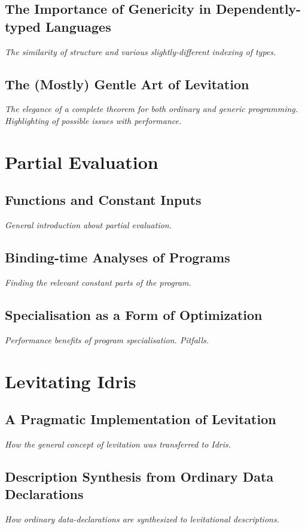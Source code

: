 \documentclass{ituthesis}
\begin{document}
\section{The Importance of Genericity in Dependently-typed Languages}
\label{sec:TheImportanceofGenericityinDependently-typedLanguages}
\textit{The similarity of structure and various slightly-different indexing of types.}
\section{The (Mostly) Gentle Art of Levitation}
\label{sec:TheMostlyGentleArtofLevitation}
\textit{The elegance of a complete theorem for both ordinary and generic programming. Highlighting of possible issues with performance.}
\chapter{Partial Evaluation}
\label{cha:PartialEvaluation}
\section{Functions and Constant Inputs}
\label{sec:FunctionsandConstantInputs}
\textit{General introduction about partial evaluation.}
\section{Binding-time Analyses of Programs}
\label{sec:Binding-timeAnalysisofPrograms}
\textit{Finding the relevant constant parts of the program.}
\section{Specialisation as a Form of Optimization}
\label{sec:SpecialisationasaFormofOptimization}
\textit{Performance benefits of program specialisation. Pitfalls.}
\chapter{Levitating Idris}
\label{cha:LevitatingIdris}
\section{A Pragmatic Implementation of Levitation}
\label{sec:APragmaticImplementationofLevitation}
\textit{How the general concept of levitation was transferred to Idris.}
\section{Description Synthesis from Ordinary Data Declarations}
\label{sec:DescriptionSynthesisFromOrdinaryDataDeclarations}
\textit{How ordinary data-declarations are synthesized to levitational descriptions.}
\end{document}
